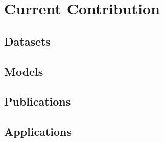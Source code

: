 
\chapter{Current Contribution}
\label{chap:contribution}
\section{Datasets}
\label{sec:pretrain}
\section{Models}
\label{sec:models}
\section{Publications}
\label{sec:models}
\section{Applications}
\label{sec:models}